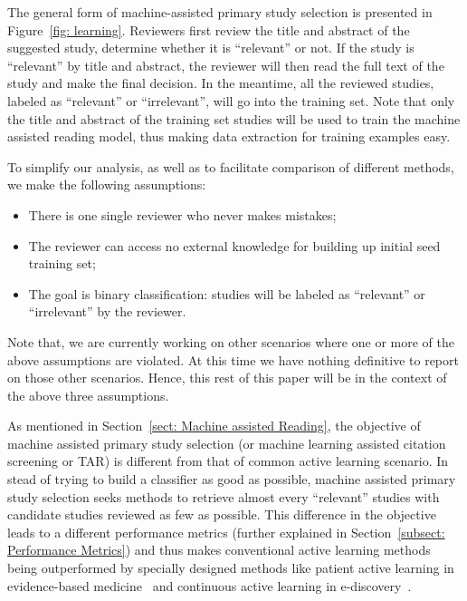 \documentclass[final,twocolumn,5p]{elsarticle}
\theoremstyle{break}
\begin{document}
The general form of machine-assisted primary study selection is presented in
Figure~\ref{fig: learning}. Reviewers first review the title and abstract of the
suggested study, determine whether it is ``relevant'' or not. If the study is
``relevant'' by title and abstract, the reviewer will then read the full text of
the study and make the final decision. In the meantime, all the reviewed
studies, labeled as ``relevant'' or ``irrelevant'', will go into the training
set. Note that only the title and abstract of the training set studies will be used to
train the machine assisted reading model, thus making data extraction for training examples easy.

To simplify our analysis, as well as to facilitate comparison of different methods,
we make the following assumptions:

\begin{itemize}

\item
There is one single reviewer who never makes mistakes;

\item
The reviewer can access no external knowledge for building up initial seed training set;

\item
The goal is binary classification: studies will be labeled as ``relevant'' or ``irrelevant'' by the reviewer.

\end{itemize}
Note that, we are currently working on other scenarios where one or more of the
above assumptions are violated.  At this time we have nothing definitive to
report on those other scenarios. Hence, this rest of this paper will be in the context
of the above three assumptions.

As mentioned in Section~\ref{sect: Machine assisted Reading}, the objective of machine assisted primary study selection (or machine learning
assisted citation screening or TAR) is different from that of common active
learning scenario. In stead of trying to build a classifier as good as possible,
machine assisted primary study selection seeks methods to retrieve almost every
``relevant'' studies with candidate studies reviewed as few as possible. This
difference in the objective leads to a different performance metrics (further explained in Section~\ref{subsect: Performance Metrics}) and thus
makes conventional active learning methods being outperformed by specially
designed methods like patient active learning in evidence-based
medicine~\cite{wallace2010semi} and continuous active learning in
e-discovery~\cite{cormack2014evaluation,cormack2015autonomy}.
\end{document}
